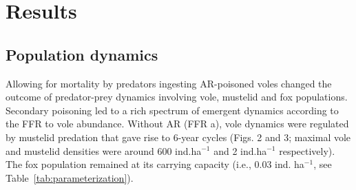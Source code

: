 \documentclass[11pt]{article}
\begin{document}
\section{Results}

\subsection{Population dynamics}

Allowing for mortality by predators ingesting AR-poisoned voles changed the outcome of predator-prey dynamics involving vole, mustelid and fox populations. Secondary poisoning led to a rich spectrum of emergent dynamics according to the FFR to vole abundance.  
Without AR (FFR a), vole dynamics were regulated by mustelid predation that gave rise to 6-year cycles (Figs. 2 and 3; maximal vole and mustelid densities were around 600 ind.ha$^{-1}$ and 2 ind.ha$^{-1}$ respectively). The fox population remained at its carrying capacity (i.e., 0.03 ind. ha$^{-1}$, see Table~\ref{tab:parameterization}).  
\end{document}
